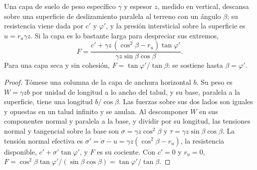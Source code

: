 \begin{proposition}\label{prop:b2:geological-hazards:infinite-slope}
Una capa de suelo de peso específico $\gamma$ y espesor $z$, medido en vertical, descansa sobre una superficie de
deslizamiento paralela al terreno con un ángulo $\beta$; su resistencia viene dada por $c'$ y $\varphi'$, y la
presión intersticial sobre la superficie es $u = r_u \gamma z$. Si la capa es lo bastante larga
para despreciar sus extremos,
\begin{equation}
F = \frac{c' + \gamma z\,(\cos^2\beta - r_u)\tan\varphi'}{\gamma z \sin\beta\cos\beta}.
\label{eq:b2:geological-hazards:infinite-slope}
\end{equation}
Para una capa seca y sin cohesión, $F = \tan\varphi'/\tan\beta$: se sostiene hasta $\beta = \varphi'$.
\end{proposition}

\begin{proof}
Tómese una columna de la capa de anchura horizontal $b$. Su peso es $W = \gamma z b$ por unidad de longitud
a lo ancho del talud, y su base, paralela a la superficie, tiene una longitud $b/\cos\beta$. Las fuerzas sobre
sus dos lados son iguales y opuestas en un talud infinito y se anulan. Al descomponer $W$ en sus componentes normal y
paralela a la base, y dividir por su longitud, las tensiones normal y tangencial sobre la base son
$\sigma = \gamma z\cos^2\beta$ y $\tau = \gamma z \sin\beta\cos\beta$. La tensión normal efectiva
es $\sigma' = \sigma - u = \gamma z(\cos^2\beta - r_u)$, la resistencia disponible, $c' +
\sigma'\tan\varphi'$, y $F$ es su cociente. Con $c' = 0$ y $r_u = 0$, $F = \cos^2\beta
\tan\varphi'/(\sin\beta\cos\beta) = \tan\varphi'/\tan\beta$.
\end{proof}

